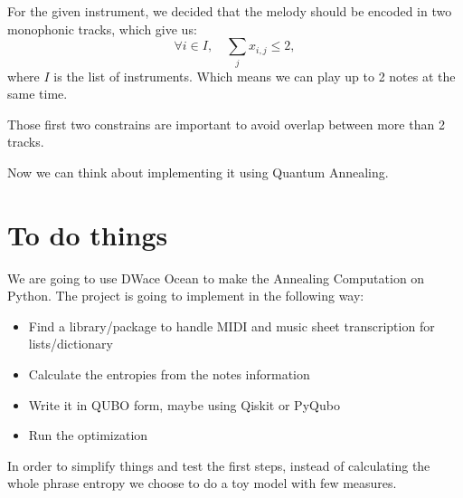 \documentclass[a4paper,onecolumn,11pt,unpublished,allowfontchangeintitle]{quantumarticle}
\theoremstyle{definition}
\begin{document}
For the given instrument, we decided that the melody should be encoded in two monophonic tracks, which give us:
\begin{equation}
 \forall i \in I , \quad \sum_j x_{i,j} \leq 2,
\end{equation}
where $I$ is the list of instruments. Which means we can play up to 2 notes at the same time. 

Those first two constrains are important to avoid overlap between more than 2 tracks.

Now we can think about implementing it using Quantum Annealing. 

\section{To do things}
We are going to use DWace Ocean to make the Annealing Computation on Python. The project is going to implement in the following way:
\begin{itemize}
	\item Find a library/package to handle MIDI and music sheet transcription for lists/dictionary
	\item Calculate the entropies from the notes information
	\item Write it in QUBO form, maybe using Qiskit or PyQubo
	\item Run the optimization
\end{itemize}

In order to simplify things and test the first steps, instead of calculating the whole phrase entropy we choose to do a toy model with few measures. 
%
%
\end{document}

